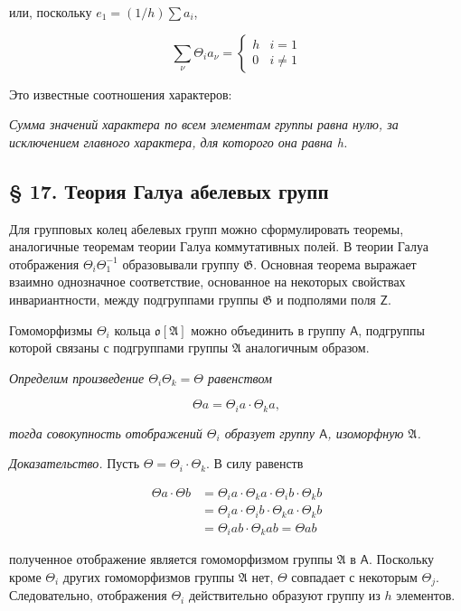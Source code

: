 \documentclass[11pt]{article}
\begin{document}
или, поскольку \(e_1 = (1/h) \sum a_i\),

\[
\sum_\nu \Theta_i a_\nu=\begin{cases} h & i=1\\ 0 & i\ne 1 \end{cases}
\]

Это известные соотношения характеров:

\emph{Сумма значений характера по всем элементам группы равна нулю, за исключением главного характера, для которого она равна h.}

\subsection*{§ 17. Теория Галуа абелевых групп}\label{die-galoissche-theorie-abelscher-gruppen}

Для групповых колец абелевых групп можно сформулировать теоремы, аналогичные теоремам теории Галуа коммутативных полей. В теории Галуа отображения \(\Theta_i\Theta_1^{-1}\) образовывали группу \(\mathfrak{G}\). Основная теорема выражает взаимно однозначное соответствие, основанное на некоторых свойствах инвариантности, между подгруппами группы \(\mathfrak{G}\) и подполями поля \(\mathsf{Z}\).

Гомоморфизмы \(\Theta_i\) кольца \(\mathfrak{o}[\mathfrak{A}]\) можно объединить в группу \(\mathsf A\), подгруппы которой связаны с подгруппами группы \(\mathfrak{A}\) аналогичным образом.

\emph{Определим произведение \(\Theta_i \Theta_k = \Theta\) равенством}

\[\Theta a = \Theta_i a \cdot \Theta_k a,\]

\emph{тогда совокупность отображений \(\Theta_i\) образует группу \(\mathsf A\), изоморфную \(\mathfrak A\).}

\emph{Доказательство.} Пусть \(\Theta = \Theta_i \cdot \Theta_k\). В силу равенств

\[\begin{aligned}
\Theta a \cdot \Theta b &= \Theta_i a \cdot \Theta_k a \cdot \Theta_i b \cdot \Theta_k b \\
&= \Theta_i a \cdot \Theta_i b \cdot \Theta_k a \cdot \Theta_k b \\
&= \Theta_i a b \cdot \Theta_k a b = \Theta a b
\end{aligned}\]

полученное отображение является гомоморфизмом группы \(\mathfrak A\) в \(\mathsf A\). Поскольку кроме \(\Theta_i\) других гомоморфизмов группы \(\mathfrak A\) нет, \(\Theta\) совпадает с некоторым \(\Theta_j\). Следовательно, отображения \(\Theta_i\) действительно образуют группу из \(h\) элементов.
\end{document}
